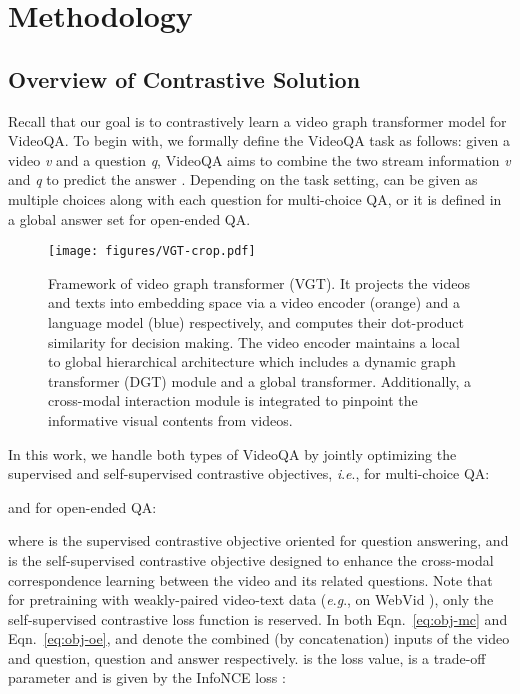 \documentclass[10pt,journal,compsoc]{IEEEtran}
\newcommand{\ie}{\textit{i}.\textit{e}.}
\newcommand{\eg}{\textit{e}.\textit{g}.}
\begin{document}
 \section{Methodology}
\label{sec:method}
\subsection{Overview of Contrastive Solution}
Recall that our goal is to contrastively learn a video graph transformer model for VideoQA. To begin with, 
we formally define the VideoQA task as follows: given a video \textit{v} and a question \textit{q}, VideoQA aims to combine the two stream information \textit{v} and \textit{q} to predict the answer \textit{}. Depending on the task setting, \textit{} can be given as multiple choices along with each question for multi-choice QA, or it is defined in a global answer set for open-ended QA. 
\begin{figure}[t]
  \begin{center}
    \texttt{[image: figures/VGT-crop.pdf]}
  \end{center}
  \vspace{-0.3cm}
  \caption{Framework of video graph transformer (VGT). It projects the videos and texts into embedding space via a video encoder (orange) and a language model (blue) respectively, and computes their dot-product similarity for decision making. The video encoder maintains a local to global hierarchical architecture which includes a dynamic graph transformer (DGT) module and a global transformer. Additionally, a cross-modal interaction module is integrated to pinpoint the informative visual contents from videos.}
  \vspace{-0.4cm}
  \label{fig:framework}
\end{figure}

In this work, we handle both types of VideoQA by jointly optimizing the supervised and self-supervised contrastive objectives, \ie, for multi-choice QA:

and for open-ended QA:


\noindent where  is the supervised contrastive objective oriented for question answering, and  is the self-supervised contrastive objective designed to enhance the cross-modal correspondence learning between the video and its related questions. Note that for pretraining with weakly-paired video-text data (\eg, on WebVid \cite{bain2021frozen}), only the self-supervised contrastive loss function is reserved. In both Eqn.~\eqref{eq:obj-mc} and Eqn.~\eqref{eq:obj-oe},  and  denote the combined (by concatenation) inputs of the video and question, question and answer respectively.  is the loss value,  is a trade-off parameter and  is given by the InfoNCE loss \cite{oord2018representation}:
\end{document}
